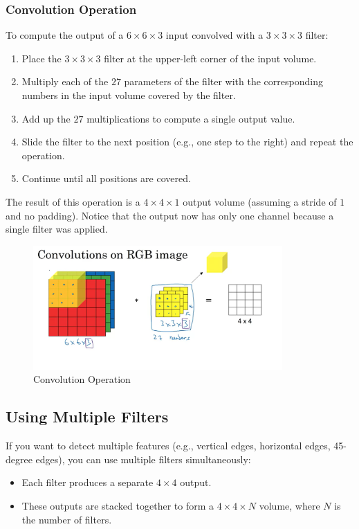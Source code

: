 \documentclass[letterpaper,12pt,notitlepage,twoside]{report}
\begin{document}
\subsubsection*{Convolution Operation}
To compute the output of a $6 \times 6 \times 3$ input convolved with a $3 \times 3 \times 3$ filter:
\begin{enumerate}
    \item Place the $3 \times 3 \times 3$ filter at the upper-left corner of the input volume.
    \item Multiply each of the $27$ parameters of the filter with the corresponding numbers in the input volume covered by the filter.
    \item Add up the $27$ multiplications to compute a single output value.
    \item Slide the filter to the next position (e.g., one step to the right) and repeat the operation.
    \item Continue until all positions are covered.
\end{enumerate}

The result of this operation is a $4 \times 4 \times 1$ output volume (assuming a stride of $1$ and no padding). Notice that the output now has only one channel because a single filter was applied.
 
\begin{figure}[h]
	\centering
	\includegraphics[width=0.85\textwidth]{Images/Convolution Operation.png}
	\caption{Convolution Operation}
	\label{fig:25}
\end{figure}
\FloatBarrier

\subsection*{Using Multiple Filters}
If you want to detect multiple features (e.g., vertical edges, horizontal edges, 45-degree edges), you can use multiple filters simultaneously:
\begin{itemize}
    \item Each filter produces a separate $4 \times 4$ output.
    \item These outputs are stacked together to form a $4 \times 4 \times N$ volume, where $N$ is the number of filters.
\end{itemize}
\end{document}
